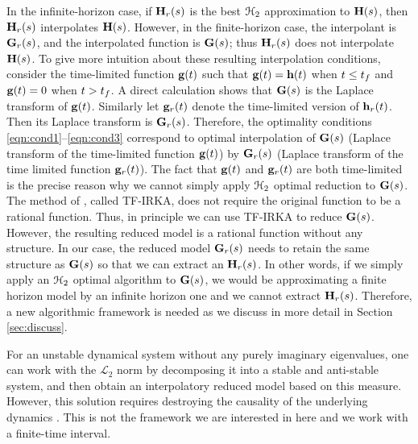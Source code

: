 \documentclass[twocolumn]{autart}
\begin{document}
\begin{remark}
{\color{black} In the infinite-horizon case, if  $\mathbf{H}_r(s)$ is the best $\EuScript{H}_2$ approximation to $\mathbf{H}(s)$, then $\mathbf{H}_r(s)$ interpolates $\mathbf{H}(s)$. However, in the finite-horizon case, 
the interpolant is $\mathbf{G}_r(s)$, and the interpolated function is $\mathbf{G}(s)$; thus $\mathbf{H}_r(s)$ does not interpolate $\mathbf{H}(s)$. To give more intuition about these resulting interpolation conditions, consider the time-limited function $\mathbf{g}(t)$ such that 
$\mathbf{g}(t)=\mathbf{h}(t)$ when   $t\leq {t_f}$ and $\mathbf{g}(t)=0$ when $t > {t_f}$.
A direct calculation shows that $\mathbf{G}(s)$ is the Laplace transform of $\mathbf{g}(t)$. Similarly let $\mathbf{g}_r(t)$ 
denote the time-limited version of $\mathbf{h}_r(t)$. Then its Laplace transform is 
 $\mathbf{G}_r(s)$.  Therefore, the optimality conditions  \eqref{eqn:cond1}--\eqref{eqn:cond3}
 correspond to optimal interpolation of $\mathbf{G}(s)$ (Laplace transform of the time-limited function
 $\mathbf{g}(t)$)
 by $\mathbf{G}_r(s)$ (Laplace transform of the time limited function  $\mathbf{g}_r(t)$). The fact that  
 $\mathbf{g}(t)$ and   $\mathbf{g}_r(t)$ are both time-limited is the precise reason  why we cannot simply apply $\EuScript{H}_2$ optimal reduction  to $\mathbf{G}(s)$. The method of \cite{beattie2012realization}, called TF-IRKA, does not require the original function to be a rational function. Thus, in principle we can use TF-IRKA to reduce $\mathbf{G}(s)$. However, the resulting reduced model is a rational function without any structure. In our case, the reduced model $\mathbf{G}_r(s)$ needs to retain the same structure as $\mathbf{G}(s)$ so that we can extract an $\mathbf{H}_r(s)$. In other words, if we simply apply an $\EuScript{H}_2$ optimal algorithm to $\mathbf{G}(s)$, we would be approximating a finite horizon model by an infinite horizon one and we cannot extract $\mathbf{H}_r(s)$. Therefore, a new  algorithmic framework  is needed as we discuss in more detail in Section \ref{sec:discuss}.}
\end{remark}

\begin{remark}
{\color{black}
For an unstable dynamical system without any purely imaginary eigenvalues, one can work with the
 $\mathcal{L}_2$ norm by decomposing it into a stable and anti-stable system, and then obtain an interpolatory reduced model based on this measure.  However, this solution requires destroying the causality of the underlying dynamics \cite{magruder2010rational}. This is not the framework we are interested in here and we  work with a finite-time interval. }
 \end{remark}
\end{document}
